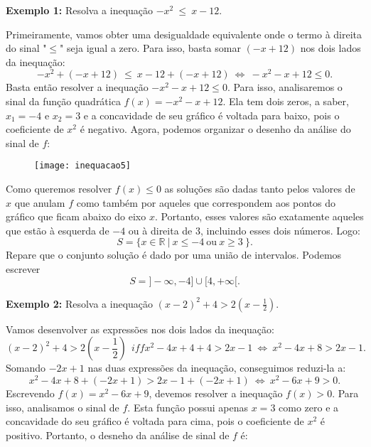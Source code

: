 \vspace{0,2 cm}

\textbf{Exemplo 1:} Resolva a inequação $-x^2 \ \leq \ x - 12$.

Primeiramente, vamos obter uma desigualdade equivalente onde o termo à direita do sinal "$\leq$"{} seja igual a zero. Para isso, basta somar $(-x + 12)$ nos dois lados da inequação:
$$
-x^2 + (-x+ 12)\  \leq \ x - 12 + (-x+12) \ \iff \ -x^2 - x + 12 \leq 0.
$$
Basta então resolver a inequação $-x^2 - x +12 \leq 0$. Para isso, analisaremos o sinal da função quadrática $f(x) = -x^2 -x +12$. Ela tem dois zeros, a saber, $x_1 = -4$ e $x_2 = 3$ e a concavidade de seu gráfico é voltada para baixo, pois o coeficiente de $x^2$ é negativo. Agora, podemos organizar o desenho da análise do sinal de $f$:

\begin{figure}[H]
\centering
\noindent\texttt{[image: inequacao5]}
\end{figure}

Como queremos resolver $f(x) \leq 0$ as soluções são dadas tanto pelos valores de $x$ que anulam $f$ como também por aqueles que correspondem aos pontos do gráfico que ficam abaixo do eixo $x$. Portanto, esses valores são exatamente aqueles que estão à esquerda de $-4$ ou à direita de $3$, incluindo esses dois números. Logo:
$$
S = \{x \in \mathbb{R}\ | \ x\leq -4 \ \mbox{ou} \ x \geq 3\ \}.
$$ 
Repare que o conjunto solução é dado por uma união de intervalos. Podemos escrever
$$
S = ]-\infty , -4] \cup [4, +\infty[.
$$

\vspace{0,2 cm}

\textbf{Exemplo 2:} Resolva a inequação $(x-2)^2 + 4 > 2(x-\frac{1}{2})$.

Vamos desenvolver as expressões nos dois lados da inequação:
$$
(x-2)^2 + 4 > 2(x-\frac{1}{2}) \ \ iff x^2 - 4x + 4 + 4 > 2x - 1 \ \iff \ x^2 - 4x + 8 > 2x - 1.
$$
Somando $-2x +1$ nas duas expressões da inequação, conseguimos reduzi-la a:
$$
x^2 - 4x + 8 + (-2x+1) > 2x - 1 + (-2x+1) \ \iff \ x^2 -6x + 9 > 0.
$$
Escrevendo $f(x) = x^2 - 6x + 9$, devemos resolver a inequação $f(x) > 0$. Para isso, analisamos o sinal de $f$. Esta função possui apenas $x = 3$ como zero e a concavidade do seu gráfico é voltada para cima, pois o coeficiente de $x^2$ é positivo. Portanto, o desneho da análise de sinal de $f$ é:

